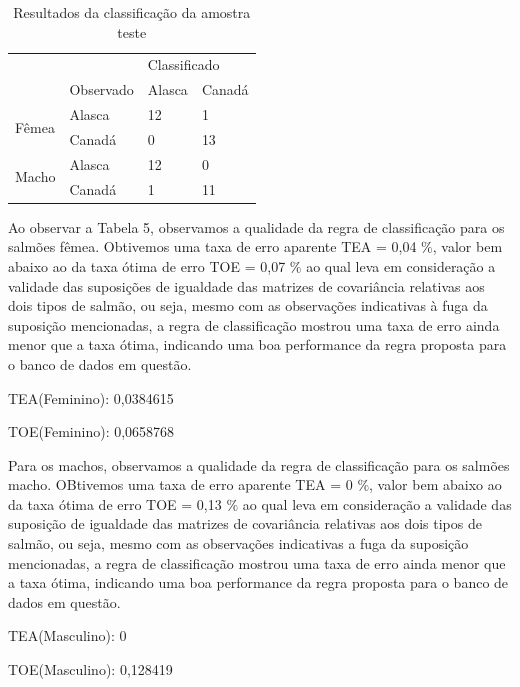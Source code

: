 \documentclass[10pt,portuguese,]{article}
\begin{document}
\begin{table}[!h]
\centering
\caption{Resultados da classificação da amostra teste}
\bgroup
\def\arraystretch{1.5}
\begin{tabular}{llll} \toprule
                       &           & \multicolumn{2}{l}{Classificado} \\
\cline{3-4}
                       & Observado & Alasca        & Canadá         \\ \midrule
\multirow{2}{*}{Fêmea} & Alasca    &      12        &     1           \\
                       & Canadá    &       0        &     13          \\ \midrule
\multirow{2}{*}{Macho} & Alasca    &      12        &     0           \\
                       & Canadá    &      1         &     11         \\ \bottomrule
   \hline
\end{tabular}
\egroup
\end{table}

Ao observar a Tabela 5, observamos a qualidade da regra de classificação
para os salmões fêmea. Obtivemos uma taxa de erro aparente TEA = 0,04
\(\%\), valor bem abaixo ao da taxa ótima de erro TOE = 0,07 \(\%\) ao
qual leva em consideração a validade das suposições de igualdade das
matrizes de covariância relativas aos dois tipos de salmão, ou seja,
mesmo com as observações indicativas à fuga da suposição mencionadas, a
regra de classificação mostrou uma taxa de erro ainda menor que a taxa
ótima, indicando uma boa performance da regra proposta para o banco de
dados em questão.

TEA(Feminino): 0,0384615

TOE(Feminino): 0,0658768

Para os machos, observamos a qualidade da regra de classificação para os
salmões macho. OBtivemos uma taxa de erro aparente TEA = 0 \(\%\), valor
bem abaixo ao da taxa ótima de erro TOE = 0,13 \(\%\) ao qual leva em
consideração a validade das suposição de igualdade das matrizes de
covariância relativas aos dois tipos de salmão, ou seja, mesmo com as
observações indicativas a fuga da suposição mencionadas, a regra de
classificação mostrou uma taxa de erro ainda menor que a taxa ótima,
indicando uma boa performance da regra proposta para o banco de dados em
questão.

TEA(Masculino): 0

TOE(Masculino): 0,128419
\end{document}
